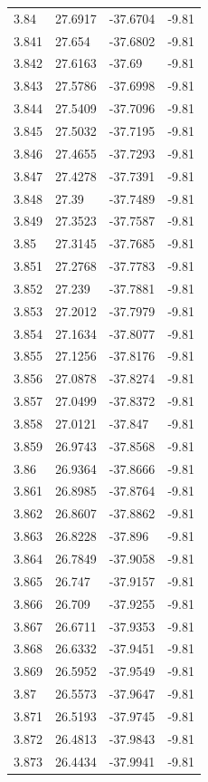 \begin{tabular}{llll}
3.84 & 27.6917 & -37.6704 & -9.81 \\
3.841 & 27.654 & -37.6802 & -9.81 \\
3.842 & 27.6163 & -37.69 & -9.81 \\
3.843 & 27.5786 & -37.6998 & -9.81 \\
3.844 & 27.5409 & -37.7096 & -9.81 \\
3.845 & 27.5032 & -37.7195 & -9.81 \\
3.846 & 27.4655 & -37.7293 & -9.81 \\
3.847 & 27.4278 & -37.7391 & -9.81 \\
3.848 & 27.39 & -37.7489 & -9.81 \\
3.849 & 27.3523 & -37.7587 & -9.81 \\
3.85 & 27.3145 & -37.7685 & -9.81 \\
3.851 & 27.2768 & -37.7783 & -9.81 \\
3.852 & 27.239 & -37.7881 & -9.81 \\
3.853 & 27.2012 & -37.7979 & -9.81 \\
3.854 & 27.1634 & -37.8077 & -9.81 \\
3.855 & 27.1256 & -37.8176 & -9.81 \\
3.856 & 27.0878 & -37.8274 & -9.81 \\
3.857 & 27.0499 & -37.8372 & -9.81 \\
3.858 & 27.0121 & -37.847 & -9.81 \\
3.859 & 26.9743 & -37.8568 & -9.81 \\
3.86 & 26.9364 & -37.8666 & -9.81 \\
3.861 & 26.8985 & -37.8764 & -9.81 \\
3.862 & 26.8607 & -37.8862 & -9.81 \\
3.863 & 26.8228 & -37.896 & -9.81 \\
3.864 & 26.7849 & -37.9058 & -9.81 \\
3.865 & 26.747 & -37.9157 & -9.81 \\
3.866 & 26.709 & -37.9255 & -9.81 \\
3.867 & 26.6711 & -37.9353 & -9.81 \\
3.868 & 26.6332 & -37.9451 & -9.81 \\
3.869 & 26.5952 & -37.9549 & -9.81 \\
3.87 & 26.5573 & -37.9647 & -9.81 \\
3.871 & 26.5193 & -37.9745 & -9.81 \\
3.872 & 26.4813 & -37.9843 & -9.81 \\
3.873 & 26.4434 & -37.9941 & -9.81 \\

\end{tabular}
